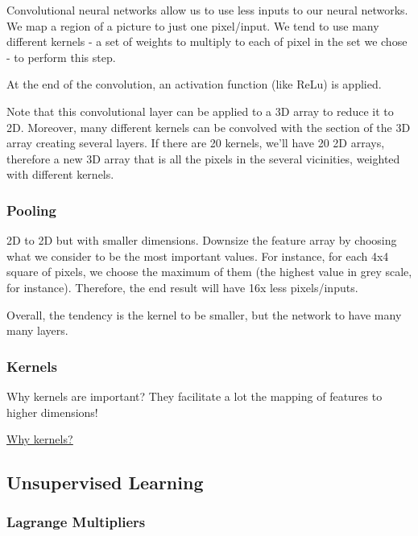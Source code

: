 Convolutional neural networks allow us to use less inputs to our neural networks. We map a region of a picture to just one pixel/input. We tend to use many different kernels - a set of weights to multiply to each of pixel in the set we chose - to perform this step.




At the end of the convolution, an activation function (like ReLu) is applied.

Note that this convolutional layer can be applied to a 3D array to reduce it to 2D. Moreover, many different kernels can be convolved with the section of the 3D array creating several layers. If there are 20 kernels, we'll have 20 2D arrays, therefore a new 3D array that is all the pixels in the several vicinities, weighted with different kernels.





\subsubsection*{Pooling}
2D to 2D but with smaller dimensions.
Downsize the feature array by choosing what we consider to be the most important values. For instance, for each 4x4 square of pixels, we choose the maximum of them (the highest value in grey scale, for instance). Therefore, the end result will have 16x less pixels/inputs. 



Overall, the tendency is the kernel to be smaller, but the network to have many many layers.


\subsubsection{Kernels}
Why kernels are important? They facilitate a lot the mapping of features to higher dimensions!

\href{https://medium.com/@zxr.nju/what-is-the-kernel-trick-why-is-it-important-98a98db0961d}{\ul{Why kernels?}}



\subsection{Unsupervised Learning}

\subsubsection{Lagrange Multipliers}

